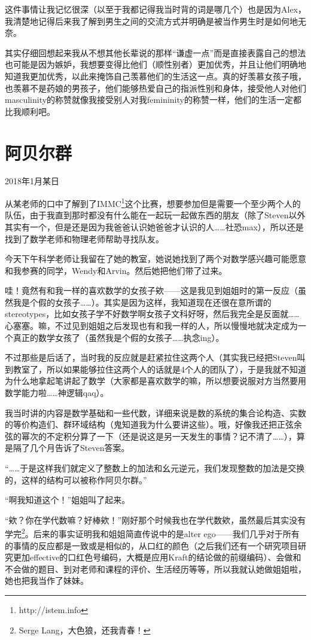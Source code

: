 \documentclass{article}
\begin{document}
这件事情让我记忆很深（以至于我都记得我当时背的词是哪几个）也是因为Alex，我清楚地记得后来我了解到男生之间的交流方式并明确是被当作男生时是如何地无奈。

其实仔细回想起来我从不想其他长辈说的那样“谦虚一点”而是直接表露自己的想法也可能是因为嫉妒，我想要变得比他们（顺性别者）更加优秀，并且让他们明确地知道我更加优秀，以此来掩饰自己羡慕他们的生活这一点。真的好羡慕女孩子哦，也羡慕不是药娘的男孩子，他们能够热爱自己的指派性别和身体，接受他人对他们masculinity的称赞就像我接受别人对我femininity的称赞一样，他们的生活一定都比我顺利吧。

\section{阿贝尔群}
2018年1月某日

从某老师的口中了解到了IMMC\footnote{http://istem.info}这个比赛，想要参加但是需要一个至少两个人的队伍，由于我直到那时都没有什么能在一起玩一起做东西的朋友（除了Steven以外其实有一个，但是还是因为我爸爸认识她爸爸才认识的人……社恐max），所以还是找到了数学老师和物理老师帮助寻找队友。

今天下午科学老师让我留在了她的教室，她说她找到了两个对数学感兴趣可能愿意和我参赛的同学，Wendy和Arvin。然后她把他们带了过来。

哇！竟然有和我一样的喜欢数学的女孩子欸——这是我见到姐姐时的第一反应（虽然我是个假的女孩子……）。其实是因为这样，我知道现在还很在意所谓的stereotypes，比如女孩子学不好数学啊女孩子文科好呀，然后我完全是反面就……心塞塞。嘛，不过见到姐姐之后发现也有和我一样的人，所以慢慢地就决定成为一个真正的数学女孩了（虽然我是个假的女孩子……执念ing）。

不过那些是后话了，当时我的反应就是赶紧拉住这两个人（其实我已经把Steven叫到教室了，所以如果能够拉住这两个人的话就是4个人的团队了），于是我就不知道为什么地拿起笔讲起了数学（大家都是喜欢数学的嘛，所以想要说服对方当然要用数学能力啦……神逻辑qaq）。

我当时讲的内容是数学基础和一些代数，详细来说是数的系统的集合论构造、实数的等价构造们、群环域结构（鬼知道我为什么要讲这些）。哦，好像我还把正弦余弦的幂次的不定积分算了一下（还是说这是另一天发生的事情？记不清了……），算是隔了几个月告诉了Steven答案。

“……于是这样我们就定义了整数上的加法和幺元逆元，我们发现整数的加法是交换的，这样的结构可以被称作阿贝尔群。”

“啊我知道这个！”姐姐叫了起来。

“欸？你在学代数嘛？好棒欸！”刚好那个时候我也在学代数欸，虽然最后其实没有学完\footnote{Serge Lang，大色狼，还我青春！}。后来的事实证明我和姐姐简直传说中的是alter ego——我们几乎对于所有的事情的反应都是一致或是相似的，从口红的颜色（之后我们还有一个研究项目研究更加effective的口红色号编码，大概是应用Kraft的结论做的前缀编码）、会做和不会做的题目、到对老师和课程的评价、生活经历等等，所以我就认她做姐姐啦，她也把我当作了妹妹。
\end{document}
